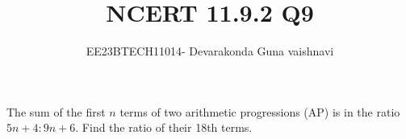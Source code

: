\documentclass[12pt]{article}
\title{NCERT 11.9.2  Q9}
\author{EE23BTECH11014- Devarakonda Guna vaishnavi}
\begin{document}
\maketitle

The sum of the first $n$ terms of two arithmetic progressions (AP) is in the ratio $5n+4 : 9n+6$. Find the ratio of their 18th terms.


\end{document}
